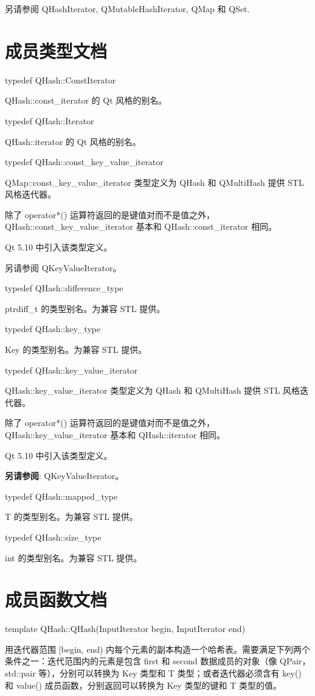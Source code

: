 另请参阅 QHashIterator, QMutableHashIterator, QMap 和 QSet.

\section{成员类型文档}

typedef QHash::ConstIterator

QHash::const\_iterator 的 Qt 风格的别名。

typedef QHash::Iterator

QHash::iterator 的 Qt 风格的别名。

typedef QHash::const\_key\_value\_iterator

QMap::const\_key\_value\_iterator 类型定义为 QHash 和 QMultiHash 提供 STL 风格迭代器。

除了 operator*() 运算符返回的是键值对而不是值之外，QHash::const\_key\_value\_iterator 基本和 QHash::const\_iterator 相同。

Qt 5.10 中引入该类型定义。

另请参阅 QKeyValueIterator。

typedef QHash::difference\_type

ptrdiff\_t 的类型别名。为兼容 STL 提供。

typedef QHash::key\_type

Key 的类型别名。为兼容 STL 提供。

typedef QHash::key\_value\_iterator

QHash::key\_value\_iterator 类型定义为 QHash 和 QMultiHash 提供 STL 风格迭代器。

除了 operator*() 运算符返回的是键值对而不是值之外，QHash::key\_value\_iterator 基本和 QHash::iterator 相同。

Qt 5.10 中引入该类型定义。

\textbf{另请参阅}: QKeyValueIterator。

typedef QHash::mapped\_type

T 的类型别名。为兼容 STL 提供。

typedef QHash::size\_type

int 的类型别名。为兼容 STL 提供。

\section{成员函数文档}

template QHash::QHash(InputIterator begin, InputIterator end)

用迭代器范围 [begin, end) 内每个元素的副本构造一个哈希表。需要满足下列两个条件之一：迭代范围内的元素是包含 first 和 second 数据成员的对象（像 QPair，std::pair 等），分别可以转换为 Key 类型和 T 类型；或者迭代器必须含有 key() 和 value() 成员函数，分别返回可以转换为 Key 类型的键和 T 类型的值。

